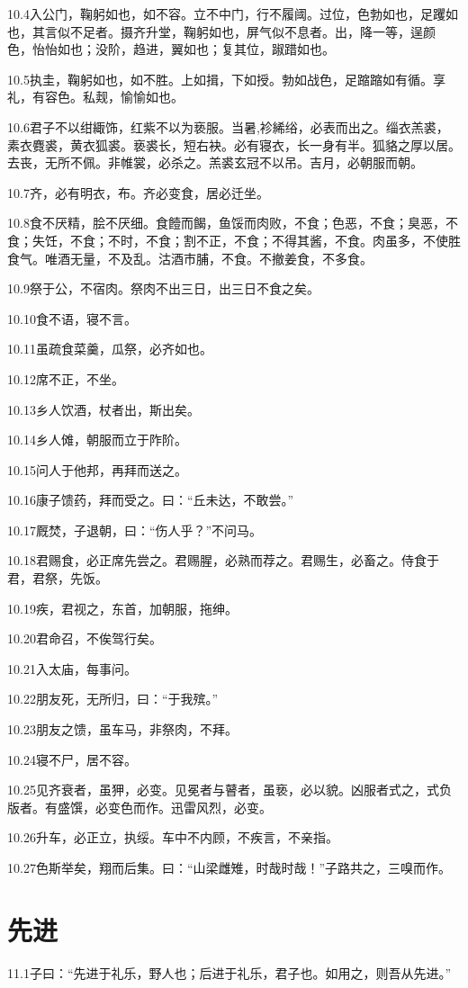 \documentclass[a4paper,12pt,UTF8,twoside]{ctexbook}
\begin{document}
10.4入公门，鞠躬如也，如不容。立不中门，行不履阈。过位，色勃如也，足躩如也，其言似不足者。摄齐升堂，鞠躬如也，屏气似不息者。出，降一等，逞颜
色，怡怡如也；没阶，趋进，翼如也；复其位，踧踖如也。

10.5执圭，鞠躬如也，如不胜。上如揖，下如授。勃如战色，足蹜蹜如有循。享礼，有容色。私觌，愉愉如也。

10.6君子不以绀緅饰，红紫不以为亵服。当暑,袗絺绤，必表而出之。缁衣羔裘，素衣麑裘，黄衣狐裘。亵裘长，短右袂。必有寝衣，长一身有半。狐貉之厚以居。去丧，无所不佩。非帷裳，必杀之。羔裘玄冠不以吊。吉月，必朝服而朝。

10.7齐，必有明衣，布。齐必变食，居必迁坐。

10.8食不厌精，脍不厌细。食饐而餲，鱼馁而肉败，不食；色恶，不食；臭恶，不食；失饪，不食；不时，不食；割不正，不食；不得其酱，不食。肉虽多，不使胜食气。唯酒无量，不及乱。沽酒市脯，不食。不撤姜食，不多食。

10.9祭于公，不宿肉。祭肉不出三日，出三日不食之矣。

10.10食不语，寝不言。

10.11虽疏食菜羹，瓜祭，必齐如也。

10.12席不正，不坐。

10.13乡人饮酒，杖者出，斯出矣。

10.14乡人傩，朝服而立于阼阶。

10.15问人于他邦，再拜而送之。

10.16康子馈药，拜而受之。曰：“丘未达，不敢尝。”

10.17厩焚，子退朝，曰：“伤人乎？”不问马。

10.18君赐食，必正席先尝之。君赐腥，必熟而荐之。君赐生，必畜之。侍食于君，君祭，先饭。

10.19疾，君视之，东首，加朝服，拖绅。

10.20君命召，不俟驾行矣。

10.21入太庙，每事问。

10.22朋友死，无所归，曰：“于我殡。”

10.23朋友之馈，虽车马，非祭肉，不拜。

10.24寝不尸，居不容。

10.25见齐衰者，虽狎，必变。见冕者与瞽者，虽亵，必以貌。凶服者式之，式负版者。有盛馔，必变色而作。迅雷风烈，必变。

10.26升车，必正立，执绥。车中不内顾，不疾言，不亲指。

10.27色斯举矣，翔而后集。曰：“山梁雌雉，时哉时哉！”子路共之，三嗅而作。

\chapter{先进}
11.1子曰：“先进于礼乐，野人也；后进于礼乐，君子也。如用之，则吾从先进。”
\end{document}
